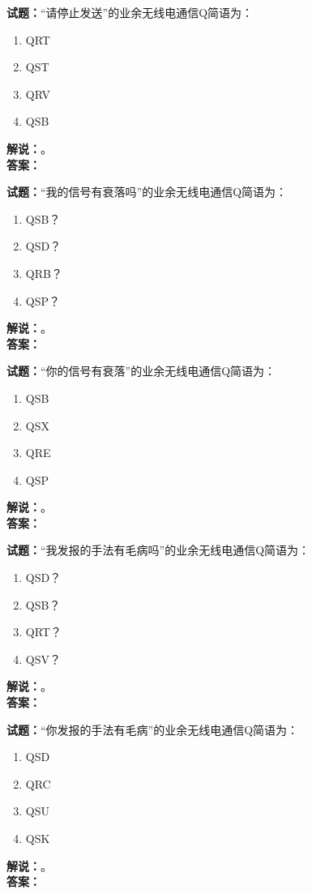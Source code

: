 \documentclass{ctexbook}
\begin{document}
\bigskip

\noindent\textbf{试题：}“请停止发送”的业余无线电通信Q简语为：
\begin{enumerate}[leftmargin=3em]
  \item QRT
  \item QST
  \item QRV
  \item QSB
\end{enumerate}
\noindent\textbf{解说：}\textbf{}。\\\noindent\textbf{答案：}

\bigskip

\noindent\textbf{试题：}“我的信号有衰落吗”的业余无线电通信Q简语为：
\begin{enumerate}[leftmargin=3em]
  \item QSB？
  \item QSD？
  \item QRB？
  \item QSP？
\end{enumerate}
\noindent\textbf{解说：}\textbf{}。\\\noindent\textbf{答案：}

\bigskip

\noindent\textbf{试题：}“你的信号有衰落”的业余无线电通信Q简语为：
\begin{enumerate}[leftmargin=3em]
  \item QSB
  \item QSX
  \item QRE
  \item QSP
\end{enumerate}
\noindent\textbf{解说：}\textbf{}。\\\noindent\textbf{答案：}

\bigskip

\noindent\textbf{试题：}“我发报的手法有毛病吗”的业余无线电通信Q简语为：
\begin{enumerate}[leftmargin=3em]
  \item QSD？
  \item QSB？
  \item QRT？
  \item QSV？
\end{enumerate}
\noindent\textbf{解说：}\textbf{}。\\\noindent\textbf{答案：}

\bigskip

\noindent\textbf{试题：}“你发报的手法有毛病”的业余无线电通信Q简语为：
\begin{enumerate}[leftmargin=3em]
  \item QSD
  \item QRC
  \item QSU
  \item QSK
\end{enumerate}
\noindent\textbf{解说：}\textbf{}。\\\noindent\textbf{答案：}
\end{document}
